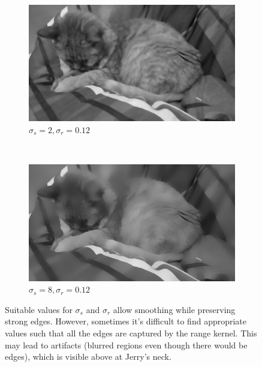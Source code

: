 \documentclass[a4spaper]{article}
\begin{document}
\begin{figure}[ht]
	\vspace{2mm}
	\begin{subfigure}[h]{0.48\textwidth}
		\centering
		\includegraphics[width=\textwidth]{jerry_flt_2_0-12}
		\caption*{$\sigma_s = 2, \sigma_r = 0.12$}
	\end{subfigure}
	~ 
	\begin{subfigure}[h]{0.48\textwidth}
		\centering
		\includegraphics[width=\textwidth]{jerry_flt_8_0-12}
		\caption*{$\sigma_s = 8, \sigma_r = 0.12$}
	\end{subfigure}
\caption{Suitable values for $\sigma_s$ and $\sigma_r$ allow smoothing while preserving strong edges. However, sometimes it's difficult to find appropriate values such that all the edges are captured by the range kernel. This may lead to artifacts (blurred regions even though there would be edges), which is visible above at Jerry's neck.}
\label{fig:edge-preserving-smoothing}
\end{figure}
\end{document}
